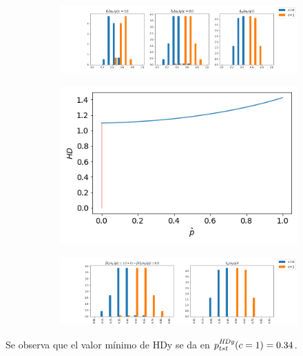 \begin{figure}[h]
    \centering
    \begin{subfigure}[b]{\textwidth}
        \centering
        \includegraphics[width=\linewidth]{../plots_teoria/hdy_1.png}
    \end{subfigure}
    \begin{subfigure}[b]{0.4\textwidth}
        \centering
        \includegraphics[width=\linewidth]{../plots_teoria/hdy_2.png}
    \end{subfigure}
    \begin{subfigure}[b]{\textwidth}
        \centering
        \includegraphics[width=\linewidth]{../plots_teoria/hdy_3.png}
    \end{subfigure}
    \hfill
\end{figure}

Se observa que el valor mínimo de HDy se da en $p^{\it HDy \/}_{tst}(c=1) =
0.34$.

